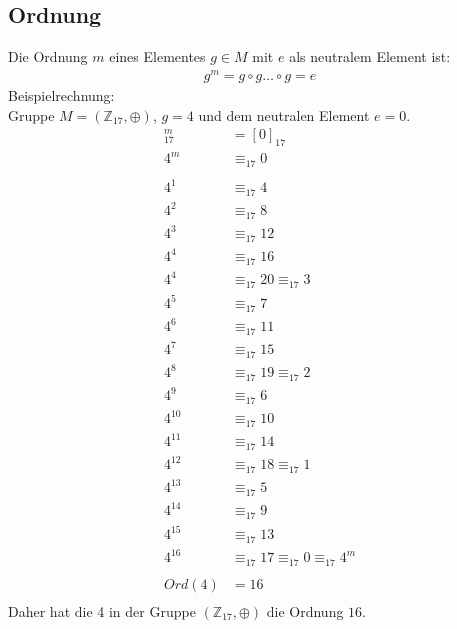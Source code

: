\subsection{Ordnung}\label{subsec:ordnung}
Die Ordnung $m$ eines Elementes $g\in M$ mit $e$ als neutralem Element ist:\\
\begin{align*}
    g^m=g\circ g \dots \circ g=e
\end{align*}
Beispielrechnung:\\
Gruppe $M=(\mathbb{Z}_{17}, \oplus)$, $g=4$ und dem neutralen Element $e=0$.
\begin{align*}
    [4]_{17}^m&=[0]_{17}\\
    4^m&\equiv_{17}0\\
    \\
    4^1&\equiv_{17}4\\
    4^2&\equiv_{17}8\\
    4^3&\equiv_{17}12\\
    4^4&\equiv_{17}16\\
    4^4&\equiv_{17}20\equiv_{17}3\\
    4^5&\equiv_{17}7\\
    4^6&\equiv_{17}11\\
    4^7&\equiv_{17}15\\
    4^8&\equiv_{17}19\equiv_{17}2\\
    4^9&\equiv_{17}6\\
    4^{10}&\equiv_{17}10\\
    4^{11}&\equiv_{17}14\\
    4^{12}&\equiv_{17}18\equiv_{17}1\\
    4^{13}&\equiv_{17}5\\
    4^{14}&\equiv_{17}9\\
    4^{15}&\equiv_{17}13\\
    4^{16}&\equiv_{17}17\equiv_{17}0\equiv_{17}4^m\\
    \\
    Ord(4)&=16\\
\end{align*}
Daher hat die 4 in der Gruppe $(\mathbb{Z}_{17}, \oplus)$ die Ordnung $16$.